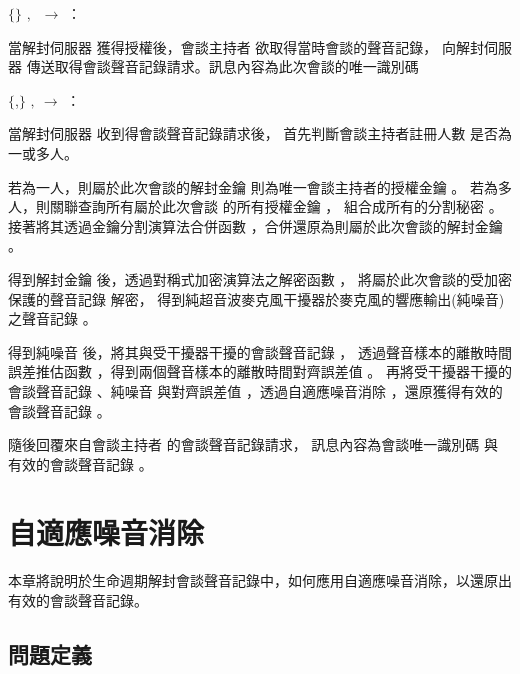 \begin{pmsgs}
    \item $\{$\DEFsessionID$\}$ $,~$ \DEFowner $\rightarrow$ \DEFserver：

        當解封伺服器 \DEFserver 獲得授權後，會談主持者 \DEFowner 欲取得當時會談的聲音記錄，
    向解封伺服器 \DEFserver 傳送取得會談聲音記錄請求。訊息內容為此次會談的唯一識別碼 \DEFsessionID

    \item $\{$\DEFsessionID,\DEFrecREV$\}$ $,~$\DEFserver $\rightarrow$ \DEFowner：

        當解封伺服器 \DEFserver 收到得會談聲音記錄請求後，
    首先判斷會談主持者註冊人數 \DEFowreg 是否為一或多人。

        若為一人，則屬於此次會談的解封金鑰 \DEFunsealKey 則為唯一會談主持者的授權金鑰 \DEFagentKey。
    若為多人，則關聯查詢所有屬於此次會談 \DEFownerAll 的所有授權金鑰 \DEFagentKey，
    組合成所有的分割秘密 \DEFsharesAll。
    接著將其透過金鑰分割演算法合併函數 \DEFfuncSSC{}，合併還原為則屬於此次會談的解封金鑰 \DEFunsealKey。

        得到解封金鑰 \DEFunsealKey 後，透過對稱式加密演算法之解密函數 \DEFfuncDecEK{}，
    將屬於此次會談的受加密保護的聲音記錄 \DEFrecP 解密，
    得到純超音波麥克風干擾器於麥克風的響應輸出(純噪音)之聲音記錄 \DEFrecN。

        得到純噪音 \DEFrecN 後，將其與受干擾器干擾的會談聲音記錄 \DEFrecJ，
    透過聲音樣本的離散時間誤差推估函數 \DEFfuncEstm{}，得到兩個聲音樣本的離散時間對齊誤差值 \DEFshift。
    再將受干擾器干擾的會談聲音記錄 \DEFrecJ、純噪音 \DEFrecN
    與對齊誤差值 \DEFshift，透過自適應噪音消除 \DEFfuncAnc{}，還原獲得有效的會談聲音記錄 \DEFrecREV。

        隨後回覆來自會談主持者 \DEFowner 的會談聲音記錄請求，
    訊息內容為會談唯一識別碼 \DEFsessionID 與 有效的會談聲音記錄 \DEFrecREV。
\end{pmsgs}


\section{自適應噪音消除}\label{sec:anc}

    本章將說明於生命週期解封會談聲音記錄中，如何應用自適應噪音消除，以還原出有效的會談聲音記錄。


\subsection{問題定義}\label{subsec:anc-prob-def}

